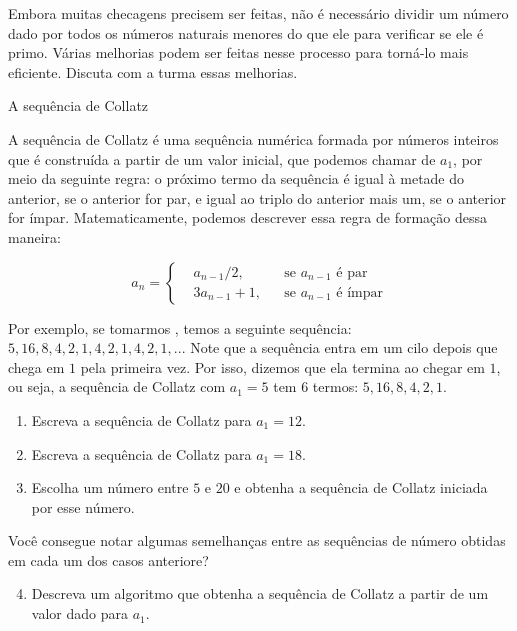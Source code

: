 \begin{reflection}
Embora muitas checagens precisem ser feitas, não é necessário dividir um número dado por todos os números naturais menores do que ele para verificar se ele é primo. Várias melhorias podem ser feitas nesse processo para torná-lo mais eficiente. Discuta com a turma essas melhorias.
\end{reflection}

\begin{task}{A sequência de Collatz}

A sequência de Collatz é uma sequência numérica formada por números inteiros que é construída a partir de um valor inicial, que podemos chamar de $a_1$, por meio da seguinte regra: o próximo termo da sequência é igual à metade do anterior, se o anterior for par, e igual ao triplo do anterior mais um, se o anterior for ímpar. Matematicamente, podemos descrever essa regra de formação dessa maneira:

$$a_n=\left \{
\begin{aligned}
&a_{n-1}/2, & & \text{se }a_{n-1}\text{ é par} \\
&3a_{n-1}+1, & & \text{se }a_{n-1}\text{ é ímpar} 
\end{aligned}
\right.$$

Por exemplo, se tomarmos , temos a seguinte sequência: $5, 16, 8, 4, 2, 1, 4, 2, 1, 4, 2, 1, ..$. Note que a sequência entra em um cilo depois que chega em $1$ pela primeira vez. Por isso, dizemos que ela termina ao chegar em $1$, ou seja, a sequência de Collatz com $a_1=5$ tem $6$ termos: $5, 16, 8, 4, 2, 1$.

\begin{enumerate}
\item Escreva a sequência de Collatz para $a_1=12$.

\item Escreva a sequência de Collatz para $a_1=18$.

\item Escolha um número entre $5$ e $20$ e obtenha a sequência de Collatz iniciada por esse número.
\end{enumerate}

\begin{reflection}
Você consegue notar algumas semelhanças entre as sequências de número obtidas em cada um dos casos anteriore?
\end{reflection}

\begin{enumerate}\setcounter{enumi}{3}
\item Descreva um algoritmo que obtenha a sequência de Collatz a partir de um valor dado para $a_1$.


\end{enumerate}
\end{task}
